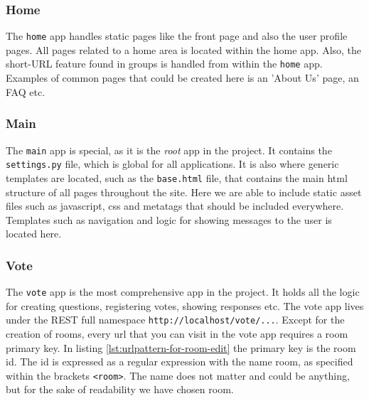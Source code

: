 \subsubsection*{Home} 
The \texttt{home} app handles static pages like the front page and also the user profile pages.
All pages related to a home area is located within the home app. Also, the short-URL feature found in groups is handled from within the \texttt{home} app. Examples of common pages that could be created here is an 'About Us' page, an FAQ etc.

\subsubsection*{Main}
The \texttt{main} app is special, as it is the \emph{root} app in the project. It contains the \texttt{settings.py} file, which is global for all applications. It is also where generic templates are located, such as the \texttt{base.html} file, that contains the main html structure of all pages throughout the site. Here we are able to include static asset files such as javascript, css and metatags that should be included everywhere. Templates such as navigation and logic for showing messages to the user is located here.


\subsubsection*{Vote}
The \texttt{vote} app is the most comprehensive app in the project. It holds all the logic for creating questions, registering votes, showing responses etc. The vote app lives under the REST full namespace \texttt{http://localhost/vote/...}. Except for the creation of rooms, every url that you can visit in the vote app requires a room primary key. In listing \ref{lst:urlpattern-for-room-edit} the primary key is the room id. The id is expressed as a regular expression with the name room, as specified within the brackets \texttt{<room>}. The name does not matter and could be anything, but for the sake of readability we have chosen room.

